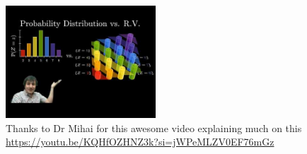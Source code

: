 \documentclass[12pt]{article}
\begin{document}
\begin{figure}[!htb]
\begin{minipage}[t]{.4\textwidth}
      \vspace{1em}
      \includegraphics[width=0.5\textwidth]{images/rvnotrandom.jpg}\\
      Thanks to Dr Mihai for this awesome video explaining much on this
      \tiny \url{https://youtu.be/KQHfOZHNZ3k?si=jWPeMLZV0EF76mGz}
    \end{minipage}
\end{figure}
\pagebreak
\end{document}
